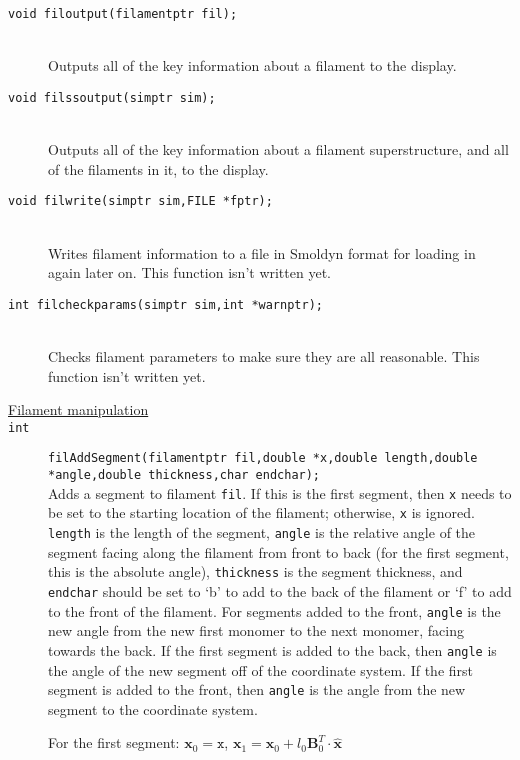 \documentclass {book}
\begin{document}
\begin{description}
\item[\texttt{void filoutput(filamentptr fil);}]
\hfill \\
Outputs all of the key information about a filament to the display.

\item[\texttt{void filssoutput(simptr sim);}]
\hfill \\
Outputs all of the key information about a filament superstructure, and all of the filaments in it, to the display.

\item[\texttt{void filwrite(simptr sim,FILE *fptr);}]
\hfill \\
Writes filament information to a file in Smoldyn format for loading in again later on. This function isn't written yet.

\item[\texttt{int filcheckparams(simptr sim,int *warnptr);}]
\hfill \\
Checks filament parameters to make sure they are all reasonable. This function isn't written yet.

\item[\underline{Filament manipulation}]

\item[\texttt{int}]
\texttt{filAddSegment(filamentptr fil,double *x,double length,double *angle,double thickness,char endchar);}
\hfill \\
Adds a segment to filament \texttt{fil}. If this is the first segment, then \texttt{x} needs to be set to the starting location of the filament; otherwise, \texttt{x} is ignored. \texttt{length} is the length of the segment, \texttt{angle} is the relative angle of the segment facing along the filament from front to back (for the first segment, this is the absolute angle), \texttt{thickness} is the segment thickness, and \texttt{endchar} should be set to `b' to add to the back of the filament or `f' to add to the front of the filament. For segments added to the front, \texttt{angle} is the new angle from the new first monomer to the next monomer, facing towards the back. If the first segment is added to the back, then \texttt{angle} is the angle of the new segment off of the coordinate system. If the first segment is added to the front, then \texttt{angle} is the angle from the new segment to the coordinate system.

For the first segment:
$\mathbf{x}_0=\texttt{x}$,
$\mathbf{x}_1=\mathbf{x}_0 + l_0 \mathbf{B}^T_0 \cdot \mathbf{\hat{x}}$


\end{description}
\end{document}
